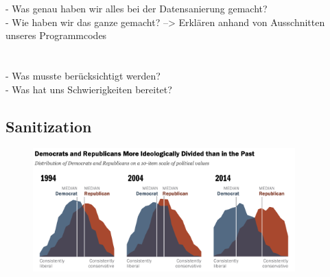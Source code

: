 	
	- Was genau haben wir alles bei der Datensanierung gemacht?\\
	- Wie haben wir das ganze gemacht? --> Erklären anhand von Ausschnitten unseres Programmcodes\\\\\\
	
	- Was musste berücksichtigt werden?\\
	- Was hat uns Schwierigkeiten bereitet?	
	
	
	\subsection{Sanitization}
	

	
	\begin{figure}[ht]
		\centering
		\includegraphics[width=0.9\textwidth]{images/Kapitel1/PoliticalPolarization}
	\end{figure}
	
	
